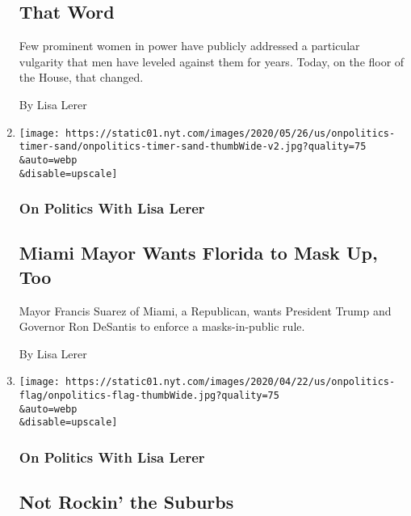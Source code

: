 \begin{enumerate}
  \hypertarget{that-word}{%
  \subsection{That Word}\label{that-word}}

  Few prominent women in power have publicly addressed a particular
  vulgarity that men have leveled against them for years. Today, on the
  floor of the House, that changed.

  By Lisa Lerer
\item
  \href{/2020/07/22/us/politics/miami-mayor-francis-suarez-masks.html}{}

  \texttt{[image: https://static01.nyt.com/images/2020/05/26/us/onpolitics-timer-sand/onpolitics-timer-sand-thumbWide-v2.jpg?quality=75\\\&auto=webp\\\&disable=upscale]}

  \hypertarget{on-politics-with-lisa-lerer-4}{%
  \subsubsection{On Politics With Lisa
  Lerer}\label{on-politics-with-lisa-lerer-4}}

  \hypertarget{miami-mayor-wants-florida-to-mask-up-too}{%
  \subsection{Miami Mayor Wants Florida to Mask Up,
  Too}\label{miami-mayor-wants-florida-to-mask-up-too}}

  Mayor Francis Suarez of Miami, a Republican, wants President Trump and
  Governor Ron DeSantis to enforce a masks-in-public rule.

  By Lisa Lerer
\item
  \href{/2020/07/20/us/politics/trump-suburbs.html}{}

  \texttt{[image: https://static01.nyt.com/images/2020/04/22/us/onpolitics-flag/onpolitics-flag-thumbWide.jpg?quality=75\\\&auto=webp\\\&disable=upscale]}

  \hypertarget{on-politics-with-lisa-lerer-5}{%
  \subsubsection{On Politics With Lisa
  Lerer}\label{on-politics-with-lisa-lerer-5}}

  \hypertarget{not-rockin-the-suburbs}{%
  \subsection{Not Rockin' the Suburbs}\label{not-rockin-the-suburbs}}


\end{enumerate}
